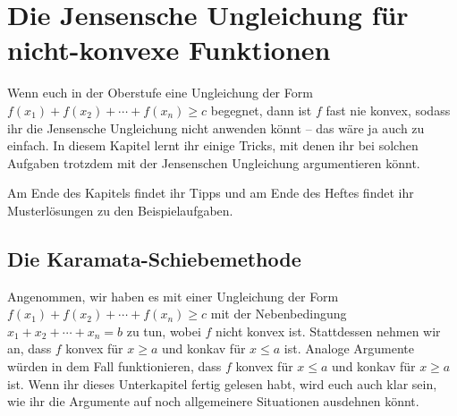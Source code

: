 \section{Die Jensensche Ungleichung für nicht-konvexe Funktionen}\label{kapitel:LCF}
Wenn euch in der Oberstufe eine Ungleichung der Form $f(x_1)+f(x_2)+\dotsb+f(x_n)\geqslant c$ begegnet, dann ist $f$ fast nie konvex, sodass ihr die Jensensche Ungleichung nicht anwenden könnt -- das wäre ja auch zu einfach. In diesem Kapitel lernt ihr einige Tricks, mit denen ihr bei solchen Aufgaben trotzdem mit der Jensenschen Ungleichung argumentieren könnt.

Am Ende des Kapitels findet ihr Tipps und am Ende des Heftes findet ihr Musterlösungen zu den Beispielaufgaben.

\subsection*{Die Karamata-Schiebemethode}
Angenommen, wir haben es mit einer Ungleichung der Form $f(x_1)+f(x_2)+\dotsb+f(x_n)\geqslant c$ mit der Nebenbedingung $x_1+x_2+\dotsb+x_n=b$ zu tun, wobei $f$ nicht konvex ist. Stattdessen nehmen wir an, dass $f$ konvex für $x\geqslant a$ und konkav für $x\leqslant a$ ist. Analoge Argumente würden in dem Fall funktionieren, dass $f$ konvex für $x\leqslant a$ und konkav für $x\geqslant a$ ist. Wenn ihr dieses Unterkapitel fertig gelesen habt, wird euch auch klar sein, wie ihr die Argumente auf noch allgemeinere Situationen ausdehnen könnt.

